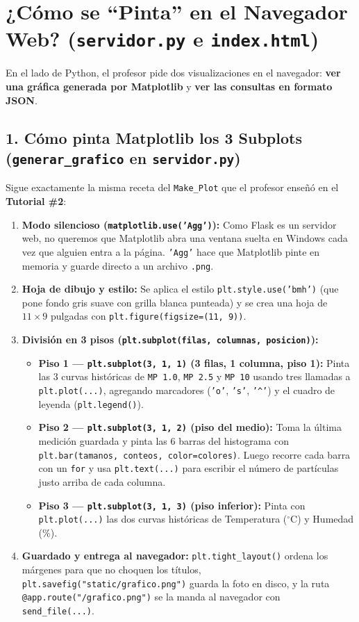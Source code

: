 \documentclass[11pt,a4paper]{article}
\begin{document}
\newpage
\section{¿Cómo se ``Pinta'' en el Navegador Web? (\texttt{servidor.py} e \texttt{index.html})}

En el lado de Python, el profesor pide dos visualizaciones en el navegador: \textbf{ver una gráfica generada por Matplotlib} y \textbf{ver las consultas en formato JSON}.

\subsection{1. Cómo pinta Matplotlib los 3 Subplots (\texttt{generar\_grafico} en \texttt{servidor.py})}
Sigue exactamente la misma receta del \texttt{Make\_Plot} que el profesor enseñó en el \textbf{Tutorial \#2}:
\begin{enumerate}[leftmargin=1.5em]
    \item \textbf{Modo silencioso (\texttt{matplotlib.use('Agg')}):} Como Flask es un servidor web, no queremos que Matplotlib abra una ventana suelta en Windows cada vez que alguien entra a la página. \texttt{'Agg'} hace que Matplotlib pinte en memoria y guarde directo a un archivo \texttt{.png}.
    \item \textbf{Hoja de dibujo y estilo:} Se aplica el estilo \texttt{plt.style.use('bmh')} (que pone fondo gris suave con grilla blanca punteada) y se crea una hoja de $11 \times 9$ pulgadas con \texttt{plt.figure(figsize=(11, 9))}.
    \item \textbf{División en 3 pisos (\texttt{plt.subplot(filas, columnas, posicion)}):}
    \begin{itemize}
        \item \textbf{Piso 1 --- \texttt{plt.subplot(3, 1, 1)} (3 filas, 1 columna, piso 1):} Pinta las 3 curvas históricas de \texttt{MP 1.0}, \texttt{MP 2.5} y \texttt{MP 10} usando tres llamadas a \texttt{plt.plot(...)}, agregando marcadores (\texttt{'o'}, \texttt{'s'}, \texttt{'\textasciicircum'}) y el cuadro de leyenda (\texttt{plt.legend()}).
        \item \textbf{Piso 2 --- \texttt{plt.subplot(3, 1, 2)} (piso del medio):} Toma la última medición guardada y pinta las 6 barras del histograma con \texttt{plt.bar(tamanos, conteos, color=colores)}. Luego recorre cada barra con un \texttt{for} y usa \texttt{plt.text(...)} para escribir el número de partículas justo arriba de cada columna.
        \item \textbf{Piso 3 --- \texttt{plt.subplot(3, 1, 3)} (piso inferior):} Pinta con \texttt{plt.plot(...)} las dos curvas históricas de Temperatura ($^\circ\text{C}$) y Humedad ($\%$).
    \end{itemize}
    \item \textbf{Guardado y entrega al navegador:} \texttt{plt.tight\_layout()} ordena los márgenes para que no choquen los títulos, \texttt{plt.savefig("static/grafico.png")} guarda la foto en disco, y la ruta \texttt{@app.route("/grafico.png")} se la manda al navegador con \texttt{send\_file(...)}.
\end{enumerate}
\end{document}

